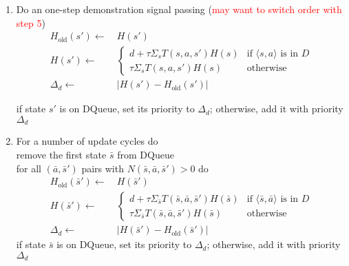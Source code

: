 \documentclass{article}
\begin{document}
\begin{enumerate}
\item Do an one-step demonstration signal passing (\textcolor{red}{may want to switch order with step 5})\\
\[
\begin{split}
H_{\text{old}}(s') \leftarrow\ & H(s')\\
H(s') \leftarrow\ & \begin{cases}
    d + \tau \Sigma_s T(s,a,s') H(s)& \text{if \(\langle s,a \rangle\) is in $D$}\\
    \tau \Sigma_s T(s,a,s') H(s)& \text{otherwise}
  \end{cases}\\
  \Delta_d \leftarrow\ & |H(s')-H_{\text{old}}(s')|
  \end{split}
\]

if state $s'$ is on DQueue, set its priority to $\Delta_d$; otherwise, add it with priority $\Delta_d$
\item For a number of update cycles do\\
remove the first state $\bar{s}$ from DQueue\\
for all $(\bar{a},\bar{s}')$ pairs with $N(\bar{s},\bar{a},\bar{s}')>0$ do
\[
\begin{split}
H_{\text{old}}(\bar{s}') \leftarrow\ & H(\bar{s}')\\
H(\bar{s}') \leftarrow\ & \begin{cases}
    d + \tau \Sigma_{\bar{s}} T(\bar{s},\bar{a},\bar{s}') H(\bar{s})& \text{if \(\langle \bar{s},\bar{a} \rangle\) is in $D$}\\
    \tau \Sigma_{\bar{s}} T(\bar{s},\bar{a},\bar{s}') H(\bar{s})& \text{otherwise}
  \end{cases}\\
  \Delta_d \leftarrow\ & |H(\bar{s}')-H_{\text{old}}(\bar{s}')|
  \end{split}
\] 
if state $\bar{s}$ is on DQueue, set its priority to $\Delta_d$; otherwise, add it with priority $\Delta_d$




	
\end{enumerate}
\end{document}

